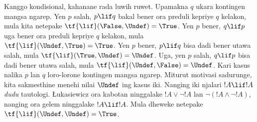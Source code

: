 \documentclass[../../../include/open-logic-section]{subfiles}
\begin{document}
Kanggo kondisional, kahanane rada luwih ruwet. Upamakna $q$
ukara kontingen mangsa ngarep. Yen $p$ salah, $p \lif q$
bakal bener ora preduli kepriye $q$ kelakon, mula kita netepake
$\tf{\lif}(\False, \Undef) = \True$. Yen $p$ bener,
$q \lif p$ uga bener ora preduli kepriye $q$ kelakon,
mula $\tf{\lif}(\Undef, \True) = \True$. Yen $p$ bener,
$p \lif q$ bisa dadi bener utawa salah, mula
$\tf{\lif}(\True, \Undef) = \Undef$. Uga, yen $p$ salah,
$q \lif p$ bisa dadi bener utawa salah, mula
$\tf{\lif}(\Undef, \False) = \Undef$. Kari kasus
nalika $p$ lan $q$ loro-lorone kontingen mangsa ngarep.
Miturut motivasi sadurunge, kita sakmesthine menehi nilai
$\Undef$ ing kasus iki. Nanging iki njalari $!A \lif !A$
\emph{dudu} tautologi. \L ukasiewicz ora kabotan ninggalake
$!A \lor \lnot !A$ lan $\lnot(!A \land \lnot !A)$,
nanging ora gelem ninggalake $!A \lif !A$. Mula dheweke
netepake $\tf{\lif}(\Undef, \Undef) = \True$.
\end{document}
